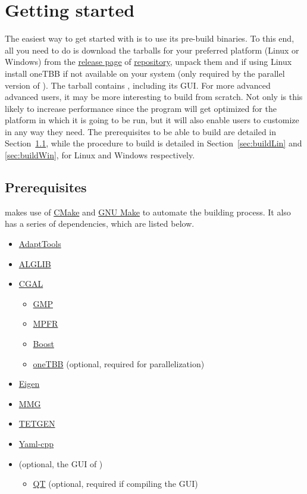 \section{Getting started} \label{sec:installation}
The easiest way to get started with \asli{} is to use its pre-build binaries. To this end, all you need to do is download the tarballs for your preferred platform (Linux or Windows) from the \href{https://github.com/tpms-lattice/ASLI/releases}{release page} of \href{https://github.com/tpms-lattice/ASLI}{\asli{} repository}, unpack them and if using Linux install oneTBB if not available on your system (only required by the parallel version of \asli{}). The tarball contains \asli{}, including its GUI. For more advanced advanced users, it may be more interesting to build \asli{} from scratch. Not only is this likely to increase performance since the program will get optimized for the platform in which it is going to be run, but it will also enable users to customize \asli{} in any way they need. The prerequisites to be able to build \asli{} are detailed in Section~\ref{sec:prerequisites}, while the procedure to build \asli{} is detailed in Section~\ref{sec:buildLin} and \ref{sec:buildWin}, for Linux and Windows respectively. 

\subsection{Prerequisites} \label{sec:prerequisites}
\asli{} makes use of \href{http://www.cmake.org}{CMake} and \href{https://www.gnu.org/software/make/}{GNU Make} to automate the building process. It also has a series of dependencies, which are listed below.
\begin{itemize}
	\item \href{https://github.com/ISCDtoolbox/AdaptTools}{AdaptTools}
	\item \href{https://www.alglib.net}{ALGLIB}
	\item \href{https://www.cgal.org}{CGAL}
	\begin{itemize}
		\item \href{https://gmplib.org}{GMP}
		\item \href{https://www.mpfr.org}{MPFR}
		\item \href{https://www.boost.org}{Boost}
		\item \href{http://intel.com/oneTBB}{oneTBB} (optional, required for parallelization)
	\end{itemize}
	\item \href{http://eigen.tuxfamily.org}{Eigen}
	\item \href{https://www.mmgtools.org}{MMG}
	\item \href{http://tetgen.org}{TETGEN}
	\item \href{https://github.com/jbeder/yaml-cpp}{Yaml-cpp}
	\item \href{https://github.com/tpms-lattice/QASLI}{\qasli{}} (optional, the GUI of \asli{})
	\begin{itemize}
		\item \href{https://www.qt.io}{QT} (optional, required if compiling the GUI)
	\end{itemize}
\end{itemize}

